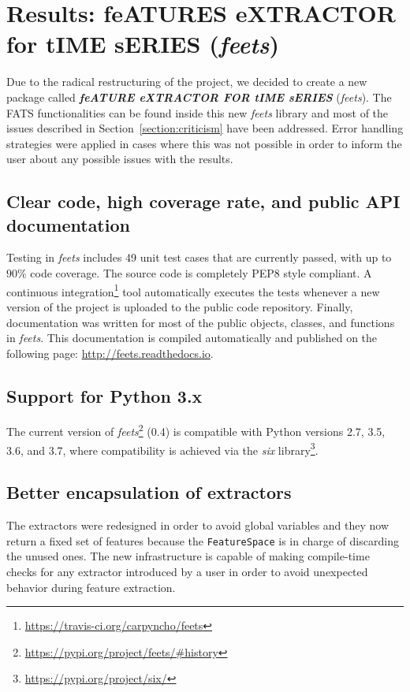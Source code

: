 \documentclass[final,5p,times,twocolumn,authoryear]{elsarticle}
\begin{document}
\section{Results: {feATURES eXTRACTOR for tIME sERIES} (\textit{feets})}
\label{section:results}
%
Due to the radical restructuring of the project,
we decided to create a new package called 
\textit{\textbf{feATURE eXTRACTOR FOR tIME sERIES}} (\textit{feets}).
%
The FATS functionalities can be found inside this new \textit{feets} library 
and most of the issues described in Section~\ref{section:criticism} have been addressed. 
Error handling strategies were applied in cases where this was not possible
in order to inform the user about any possible issues with the results.

\subsection{Clear code, high coverage rate, and public API documentation}
%
Testing in \textit{feets} includes 49 unit test cases that are currently passed,
with up to $90\%$ code coverage. 
%
The source code is completely PEP8 style compliant. 
A continuous integration\footnote{\url{https://travis-ci.org/carpyncho/feets}} 
tool automatically executes the tests whenever a new version of the project
is uploaded to the public code repository.
%
Finally, documentation was written for most of the public objects, 
classes, and functions in \textit{feets}.
This documentation is compiled automatically and published on the 
following page: \url{http://feets.readthedocs.io}.
%
\subsection{Support for Python 3.x}
The current version of \textit{feets}\footnote{\url{https://pypi.org/project/feets/\#history}}
(0.4) is compatible with Python versions 2.7, 3.5, 3.6, and 3.7, where
compatibility is achieved via the \textit{six} 
library\footnote{\url{https://pypi.org/project/six/}}.

\subsection{Better encapsulation of extractors}
%
The extractors were redesigned in order to avoid global variables 
and they now return a fixed set of features because the \texttt{FeatureSpace}
is in charge of discarding the unused ones.
%
The new infrastructure is capable of making compile-time checks for 
any extractor introduced by a user in order to 
avoid unexpected behavior during feature extraction.
\end{document}

